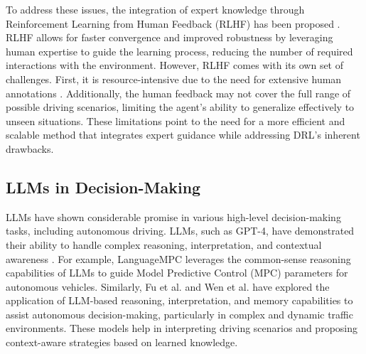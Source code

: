 To address these issues, the integration of expert knowledge through Reinforcement Learning from Human Feedback (RLHF) has been proposed \cite{sun2023aligning}. RLHF allows for faster convergence and improved robustness by leveraging human expertise to guide the learning process, reducing the number of required interactions with the environment. However, RLHF comes with its own set of challenges. First, it is resource-intensive due to the need for extensive human annotations \cite{yu2024rlhf}. Additionally, the human feedback may not cover the full range of possible driving scenarios, limiting the agent's ability to generalize effectively to unseen situations. These limitations point to the need for a more efficient and scalable method that integrates expert guidance while addressing DRL's inherent drawbacks.

\subsection{LLMs in Decision-Making}
LLMs have shown considerable promise in various high-level decision-making tasks, including autonomous driving. LLMs, such as GPT-4, have demonstrated their ability to handle complex reasoning, interpretation, and contextual awareness \cite{fang2024towards}. For example, LanguageMPC \cite{sha2023languagempc} leverages the common-sense reasoning capabilities of LLMs to guide Model Predictive Control (MPC) parameters for autonomous vehicles. Similarly, Fu et al. \cite{fu2024drive} and Wen et al. \cite{wen2023dilu} have explored the application of LLM-based reasoning, interpretation, and memory capabilities to assist autonomous decision-making, particularly in complex and dynamic traffic environments. These models help in interpreting driving scenarios and proposing context-aware strategies based on learned knowledge.

